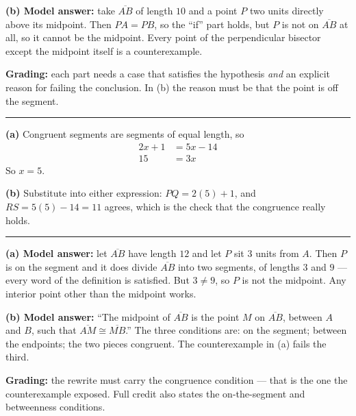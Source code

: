 \documentclass[12pt]{article}
\begin{document}
\textbf{(b) Model answer:} take $\overline{AB}$ of length $10$ and a point $P$ two units directly above its midpoint. Then $PA = PB$, so the ``if'' part holds, but $P$ is not on $\overline{AB}$ at all, so it cannot be the midpoint. Every point of the perpendicular bisector except the midpoint itself is a counterexample.

\textbf{Grading:} each part needs a case that satisfies the hypothesis \emph{and} an explicit reason for failing the conclusion. In (b) the reason must be that the point is off the segment.

\vspace{0.2cm}\noindent\rule{\linewidth}{0.2pt}


\textbf{(a)} Congruent segments are segments of equal length, so
\begin{align*}
  2x + 1 &= 5x - 14 \\
  15 &= 3x
\end{align*}
So $x = 5$. 

\textbf{(b)} Substitute into either expression: $PQ = 2(5) + 1$, and $RS = 5(5) - 14 = 11$ agrees, which is the check that the congruence really holds. 

\vspace{0.2cm}\noindent\rule{\linewidth}{0.2pt}


\textbf{(a) Model answer:} let $\overline{AB}$ have length $12$ and let $P$ sit $3$ units from $A$. Then $P$ is on the segment and it does divide $\overline{AB}$ into two segments, of lengths $3$ and $9$ --- every word of the definition is satisfied. But $3 \neq 9$, so $P$ is not the midpoint. Any interior point other than the midpoint works.

\textbf{(b) Model answer:} ``The midpoint of $\overline{AB}$ is the point $M$ on $\overline{AB}$, between $A$ and $B$, such that $\overline{AM} \cong \overline{MB}$.'' The three conditions are: on the segment; between the endpoints; the two pieces congruent. The counterexample in (a) fails the third.

\textbf{Grading:} the rewrite must carry the congruence condition --- that is the one the counterexample exposed. Full credit also states the on-the-segment and betweenness conditions.
\end{document}
